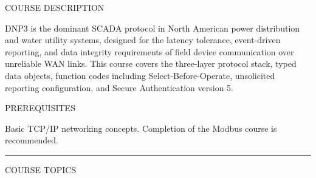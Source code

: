 \documentclass[10pt]{article}
\begin{document}

\vspace{0.70in}

{\small\sffamily\color{dgray}\MakeUppercase{Course Description}}
\smallskip

{\small DNP3 is the dominant SCADA protocol in North American power distribution and water utility systems, designed for the latency tolerance, event-driven reporting, and data integrity requirements of field device communication over unreliable WAN links. This course covers the three-layer protocol stack, typed data objects, function codes including Select-Before-Operate, unsolicited reporting configuration, and Secure Authentication version 5.}

\smallskip
{\small\sffamily\color{dgray}\MakeUppercase{Prerequisites}}
\smallskip

{\small Basic TCP/IP networking concepts. Completion of the Modbus course is recommended.}

\smallskip
{\color{dnavy}\rule{\linewidth}{1.2pt}}
\smallskip
{\small\sffamily\color{dgray}\MakeUppercase{Course Topics}}
\smallskip
\end{document}
